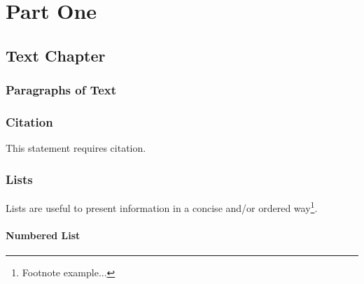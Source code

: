 \documentclass[11pt,fleqn,twoside]{book} %
\begin{document}
\pagestyle{empty} %

\tableofcontents %

\cleardoublepage %

\pagestyle{fancy} %


\part{Part One}



\chapter{Text Chapter}

\section{Paragraphs of Text}



\section{Citation}

This statement requires citation.


\section{Lists}

Lists are useful to present information in a concise and/or ordered way\footnote{Footnote example...}.

\subsection{Numbered List}
\end{document}
